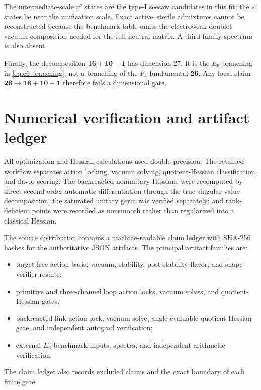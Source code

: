 \documentclass[11pt]{article}
\begin{document}
The intermediate-scale $\nu^c$ states are the type-I seesaw candidates in this fit; the $s$ states lie near the unification scale.  Exact active--sterile admixtures cannot be reconstructed because the benchmark table omits the electroweak-doublet vacuum composition needed for the full neutral matrix.  A third-family spectrum is also absent.

Finally, the decomposition $\mathbf{16}+\mathbf{10}+\mathbf{1}$ has dimension 27.  It is the $E_6$ branching in \cref{eq:e6-branching}, not a branching of the $F_4$ fundamental $\mathbf{26}$.  Any local claim $\mathbf{26}\to\mathbf{16}+\mathbf{10}+\mathbf{1}$ therefore fails a dimensional gate.

\section{Numerical verification and artifact ledger}
\label{app:repro}

All optimization and Hessian calculations used double precision.  The retained workflow separates action locking, vacuum solving, quotient-Hessian classification, and flavor scoring.  The backreacted nonunitary Hessians were recomputed by direct second-order automatic differentiation through the true singular-value decomposition; the saturated unitary germ was verified separately; and rank-deficient points were recorded as nonsmooth rather than regularized into a classical Hessian.

The source distribution contains a machine-readable claim ledger with SHA-256 hashes for the authoritative JSON artifacts.  The principal artifact families are:
\begin{itemize}[leftmargin=2.1em]
  \item target-free action basis, vacuum, stability, post-stability flavor, and shape-verifier results;
  \item primitive and three-channel loop action locks, vacuum solves, and quotient-Hessian gates;
  \item backreacted link action lock, vacuum solve, angle-evaluable quotient-Hessian gate, and independent autograd verification;
  \item external $E_6$ benchmark inputs, spectra, and independent arithmetic verification.
\end{itemize}
The claim ledger also records excluded claims and the exact boundary of each finite gate.



\end{document}
